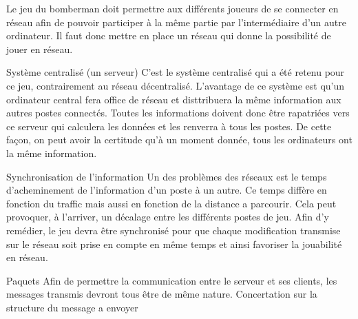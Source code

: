 Le jeu du bomberman doit permettre aux différents joueurs de se connecter en réseau afin de pouvoir participer à la même partie par l'intermédiaire d'un autre ordinateur. Il faut donc mettre en place un réseau qui donne la possibilité de jouer en réseau. 

Système centralisé (un serveur)
C'est le système centralisé qui a été retenu pour ce jeu, contrairement au réseau décentralisé. L'avantage de ce système est qu'un ordinateur central fera office de réseau et disttribuera la même information aux autres postes connectés. Toutes les informations doivent donc être rapatriées vers ce serveur qui calculera les données et les renverra à tous les postes. De cette façon, on peut avoir la certitude qu'à un moment donnée, tous les ordinateurs ont la même information.

Synchronisation de l'information
Un des problèmes des réseaux est le temps d'acheminement de l'information d'un poste à un autre. Ce temps diffère en fonction du traffic mais aussi en fonction de la distance a parcourir. Cela peut provoquer, à l'arriver, un décalage entre les différents postes de jeu. Afin d'y remédier, le jeu devra être synchronisé pour que chaque modification transmise sur le réseau soit prise en compte en même temps et ainsi favoriser la jouabilité en réseau.

Paquets
Afin de permettre la communication entre le serveur et ses clients, les messages transmis devront tous être de même nature.
Concertation sur la structure du message a envoyer
